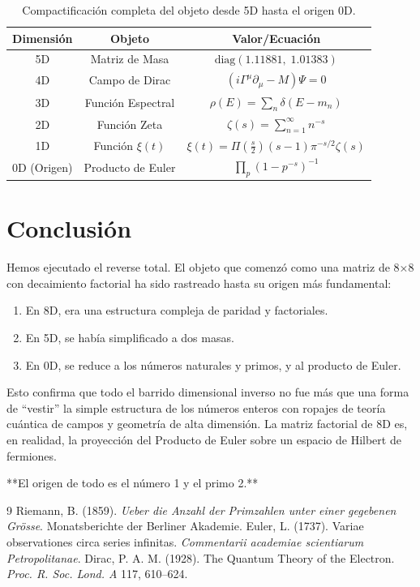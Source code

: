 \documentclass[12pt,a4paper]{article}
\begin{document}
\begin{table}[h]
\centering
\begin{tabular}{|c|c|c|}
\hline
\textbf{Dimensión} & \textbf{Objeto} & \textbf{Valor/Ecuación} \\
\hline
5D & Matriz de Masa & \(\text{diag}(1.11881,\; 1.01383)\) \\
4D & Campo de Dirac & \((i\Gamma^\mu \partial_\mu - M)\Psi = 0\) \\
3D & Función Espectral & \(\rho(E) = \sum_n \delta(E - m_n)\) \\
2D & Función Zeta & \(\zeta(s) = \sum_{n=1}^{\infty} n^{-s}\) \\
1D & Función \(\xi(t)\) & \(\xi(t) = \Pi(\frac{s}{2})(s-1)\pi^{-s/2}\zeta(s)\) \\
0D (Origen) & Producto de Euler & \(\prod_{p} (1 - p^{-s})^{-1}\) \\
\hline
\end{tabular}
\caption{Compactificación completa del objeto desde 5D hasta el origen 0D.}
\label{tab:total}
\end{table}

\section{Conclusión}

Hemos ejecutado el reverse total. El objeto que comenzó como una matriz de 8×8 con decaimiento factorial ha sido rastreado hasta su origen más fundamental:

\begin{enumerate}
\item En 8D, era una estructura compleja de paridad y factoriales.
\item En 5D, se había simplificado a dos masas.
\item En 0D, se reduce a los números naturales y primos, y al producto de Euler.
\end{enumerate}

Esto confirma que todo el barrido dimensional inverso no fue más que una forma de ``vestir'' la simple estructura de los números enteros con ropajes de teoría cuántica de campos y geometría de alta dimensión. La matriz factorial de 8D es, en realidad, la proyección del Producto de Euler sobre un espacio de Hilbert de fermiones.

**El origen de todo es el número 1 y el primo 2.** 

\begin{thebibliography}{9}
 Riemann, B. (1859). \emph{Ueber die Anzahl der Primzahlen unter einer gegebenen Grösse}. Monatsberichte der Berliner Akademie.
 Euler, L. (1737). Variae observationes circa series infinitas. \emph{Commentarii academiae scientiarum Petropolitanae}.
 Dirac, P. A. M. (1928). The Quantum Theory of the Electron. \emph{Proc. R. Soc. Lond. A} 117, 610--624.
\end{thebibliography}
\end{document}
